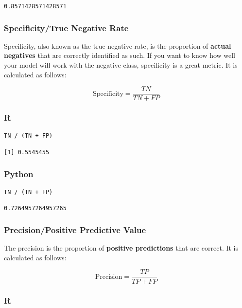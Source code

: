 \documentclass[
  letterpaper,
]{krantz}
\begin{document}
\begin{verbatim}
0.8571428571428571
\end{verbatim}

\subsubsection{Specificity/True Negative
Rate}\label{sec-knowing-metrics-specificity}

Specificity, also known as the true negative rate, is the proportion of
\textbf{actual negatives} that are correctly identified as such. If you
want to know how well your model will work with the negative class,
specificity is a great metric. It is calculated as follows:

\[\text{Specificity} = \frac{TN}{TN + FP}\]

\subsubsection{R}

\begin{verbatim}
TN / (TN + FP)
\end{verbatim}

\begin{verbatim}
[1] 0.5545455
\end{verbatim}

\subsubsection{Python}

\begin{verbatim}
TN / (TN + FP)
\end{verbatim}

\begin{verbatim}
0.7264957264957265
\end{verbatim}

\subsubsection{Precision/Positive Predictive
Value}\label{sec-knowing-metrics-precision}

The precision is the proportion of \textbf{positive predictions} that
are correct. It is calculated as follows:

\[\text{Precision} = \frac{TP}{TP + FP}\]

\subsubsection{R}
\end{document}
